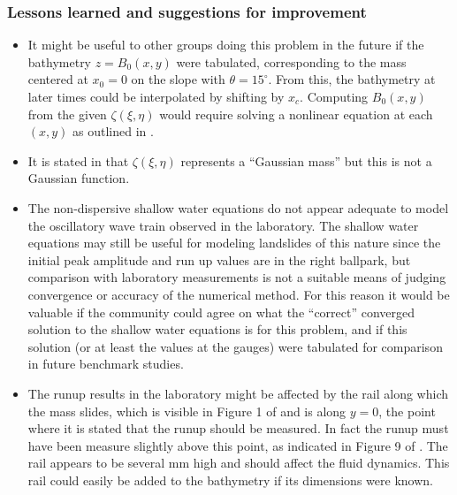 

\subsubsection{Lessons learned and suggestions for improvement}

\begin{itemize}
\item It might be useful to other groups doing this problem in the future if
the bathymetry $z=B_0(x,y)$ were tabulated, corresponding to the mass centered
at $x_0=0$ on the slope with $\theta = 15^\circ$.  From this, the bathymetry
at later times could be interpolated by shifting by $x_c$.  Computing
$B_0(x,y)$ from the given $\zeta(\xi,\eta)$ would require solving a
nonlinear equation at each $(x,y)$ as outlined in .

\item It is stated in \cite{bp-description} that $\zeta(\xi,\eta)$
represents a ``Gaussian mass'' but this is not a Gaussian function.

\item The non-dispersive shallow water equations do not appear adequate to
model the oscillatory wave train observed in the laboratory.  The shallow
water equations may still be useful for modeling landslides of this nature
since the initial peak amplitude and run up values are in the right
ballpark, but comparison with laboratory measurements is not a suitable
means of judging convergence or accuracy of the numerical method.  For this
reason it would be valuable if the community could agree on what the
``correct'' converged
solution to the shallow water equations is for this problem, and if this
solution (or at least the values at the gauges) were tabulated for
comparison in future benchmark studies.

\item The runup results in the laboratory might be affected by the rail
along which the mass slides, which is visible in Figure 1 of
\cite{bp-description} and is along $y=0$, the point where it is stated that
the runup should be measured.  In fact the runup must have been measure
slightly above this point, as indicated in Figure 9 of
\cite{EnetGrilli}.  The rail appears to be several mm high and should affect
the fluid dynamics.  This rail could easily be added to the bathymetry if
its dimensions were known.  

\end{itemize} 
